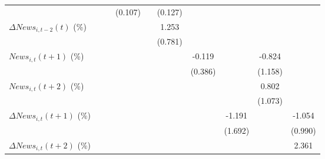 {\begin{tabular}{l*{9}{c}}
                    &                     &                     &     (0.107)         &                     &     (0.127)         &                     &                     &                     &                     \\
\addlinespace
$ \Delta News_{i,t-2}(t)$ (\%)&                     &                     &                     &                     &       1.253         &                     &                     &                     &                     \\
                    &                     &                     &                     &                     &     (0.781)         &                     &                     &                     &                     \\
\addlinespace
$ News_{i,t}(t+1)$ (\%)&                     &                     &                     &                     &                     &      -0.119         &                     &      -0.824         &                     \\
                    &                     &                     &                     &                     &                     &     (0.386)         &                     &     (1.158)         &                     \\
\addlinespace
$ News_{i,t}(t+2)$ (\%)&                     &                     &                     &                     &                     &                     &                     &       0.802         &                     \\
                    &                     &                     &                     &                     &                     &                     &                     &     (1.073)         &                     \\
\addlinespace
$ \Delta News_{i,t}(t+1)$ (\%)&                     &                     &                     &                     &                     &                     &      -1.191         &                     &      -1.054         \\
                    &                     &                     &                     &                     &                     &                     &     (1.692)         &                     &     (0.990)         \\
\addlinespace
$ \Delta News_{i,t}(t+2)$ (\%)&                     &                     &                     &                     &                     &                     &                     &                     &       2.361\sym{**} \\

\end{tabular}}
